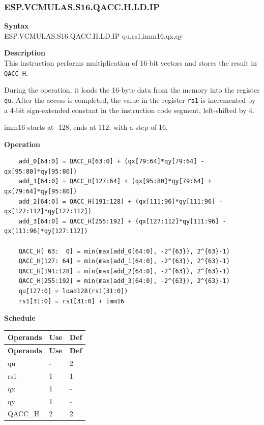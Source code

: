 \newpage
\subsubsection{ESP.VCMULAS.S16.QACC.H.LD.IP}\label{instruction:ESPVCMULASS16QACC_HLDIP}
\textbf{Syntax}\\
ESP.VCMULAS.S16.QACC.H.LD.IP qu,rs1,imm16,qx,qy

\textbf{Description}\\
This instruction performs multiplication of 16-bit vectors and stores the result in \lstinline{QACC_H}.

During the operation, it loads the 16-byte data from the memory into the register \lstinline{qu}. After the access is completed, the value in the register \lstinline{rs1} is incremented by a 4-bit sign-extended constant in the instruction code segment, left-shifted by 4.

imm16 starts at -128, ends at 112, with a step of 16.

\textbf{Operation}\\
\begin{lstlisting}
    add_0[64:0] = QACC_H[63:0] + (qx[79:64]*qy[79:64] - qx[95:80]*qy[95:80])
    add_1[64:0] = QACC_H[127:64] + (qx[95:80]*qy[79:64] + qx[79:64]*qy[95:80])
    add_2[64:0] = QACC_H[191:128] + (qx[111:96]*qy[111:96] - qx[127:112]*qy[127:112])
    add_3[64:0] = QACC_H[255:192] + (qx[127:112]*qy[111:96] - qx[111:96]*qy[127:112])

    QACC_H[ 63:  0] = min(max(add_0[64:0], -2^{63}), 2^{63}-1)
    QACC_H[127: 64] = min(max(add_1[64:0], -2^{63}), 2^{63}-1)
    QACC_H[191:128] = min(max(add_2[64:0], -2^{63}), 2^{63}-1)
    QACC_H[255:192] = min(max(add_3[64:0], -2^{63}), 2^{63}-1)
    qu[127:0] = load128(rs1[31:0])
    rs1[31:0] = rs1[31:0] + imm16
\end{lstlisting}

\textbf{Schedule}\\
\begin{longtable}[c]{|l|l|l|}
    \hline
    \rowcolor{lightgray}
    \textbf{Operands} & \textbf{Use} & \textbf{Def} \\\hline
    \endfirsthead
    \hline
    \rowcolor{lightgray}
     \textbf{Operands} & \textbf{Use} & \textbf{Def} \\\hline
    \endhead
    \hline
    \endfoot

    qu & - & 2 \\\hline
    rs1 & 1 & 1 \\\hline
     qx & 1 & - \\\hline
     qy & 1 & - \\\hline
     QACC\_H & 2 & 2

\end{longtable}

